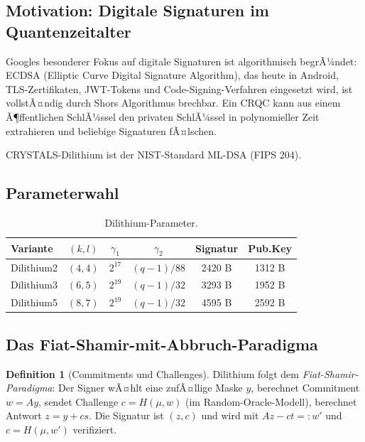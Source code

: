 ﻿\documentclass[a4paper,12pt]{article}
\theoremstyle{definition}
\newtheorem{definition}{Definition}[section]
\begin{document}
\subsection{Motivation: Digitale Signaturen im Quantenzeitalter}

Googles besonderer Fokus auf digitale Signaturen ist algorithmisch begrÃ¼ndet:
ECDSA (Elliptic Curve Digital Signature Algorithm), das heute in Android,
TLS-Zertifikaten, JWT-Tokens und Code-Signing-Verfahren eingesetzt wird,
ist vollstÃ¤ndig durch Shors Algorithmus brechbar. Ein CRQC kann aus einem
Ã¶ffentlichen SchlÃ¼ssel den privaten SchlÃ¼ssel in polynomieller Zeit extrahieren
und beliebige Signaturen fÃ¤lschen.

CRYSTALS-Dilithium \cite{DKL+22} ist der NIST-Standard ML-DSA (FIPS 204).

\subsection{Parameterwahl}

\begin{table}[H]
\centering
\caption{Dilithium-Parameter.}
\label{tab:dilithium}
\begin{tabular}{lccccc}
\toprule
Variante & $(k, l)$ & $\gamma_1$ & $\gamma_2$ & Signatur & Pub.Key\\
\midrule
Dilithium2 & $(4,4)$ & $2^{17}$ & $(q-1)/88$ & 2420 B & 1312 B\\
Dilithium3 & $(6,5)$ & $2^{19}$ & $(q-1)/32$ & 3293 B & 1952 B\\
Dilithium5 & $(8,7)$ & $2^{19}$ & $(q-1)/32$ & 4595 B & 2592 B\\
\bottomrule
\end{tabular}
\end{table}

\subsection{Das Fiat-Shamir-mit-Abbruch-Paradigma}

\begin{definition}[Commitments und Challenges]
Dilithium folgt dem \emph{Fiat-Shamir-Para\-digma}:
Der Signer wÃ¤hlt eine zufÃ¤llige Maske $y$, berechnet
Commitment $w = Ay$, sendet Challenge $c = H(\mu, w)$ (im Random-Oracle-Modell),
berechnet Antwort $z = y + cs$. Die Signatur ist $(z, c)$ und wird mit
$Az - ct =: w'$ und $c = H(\mu, w')$ verifiziert.
\end{definition}
\end{document}
